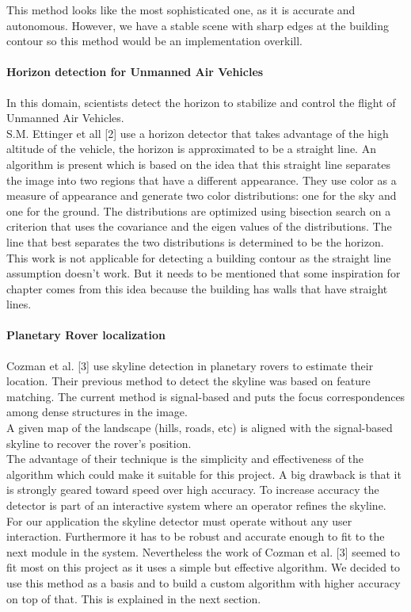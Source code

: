 This method looks like the most sophisticated one, as it is accurate and
autonomous. However, we have a stable scene with sharp edges at the
building contour so this method would be an implementation overkill.  


\paragraph{Horizon detection for Unmanned Air Vehicles}
In this domain, scientists detect the horizon to stabilize and control the
flight of Unmanned Air Vehicles.\\  
S.M. Ettinger et all [2] use a horizon detector that takes advantage of the high altitude of the vehicle, the
horizon is approximated to be a straight line.  An algorithm is present which is
based on the idea that this straight line separates the image into two regions
that have a different appearance. They use color as a measure of appearance and
generate two color distributions: one for the sky and one for the ground. The
distributions are optimized using bisection search on a criterion that uses the
covariance and the eigen values of the distributions. The line that best
separates the two distributions is determined to be the horizon.\\

This work is not applicable for detecting a building contour as the
straight line assumption doesn't work. But it needs to be mentioned that some
inspiration for chapter %
comes from this idea because the building has walls that have straight lines.

\paragraph{Planetary Rover localization}
Cozman et al. [3] use skyline detection in planetary rovers to estimate their location.  Their
previous method to detect the skyline was based on feature matching. The current
method is signal-based and puts the focus correspondences among dense structures
in the image.\\
A given map of the landscape (hills, roads, etc) is aligned with the
signal-based skyline to recover the rover's position.\\

The advantage of their technique is the simplicity and effectiveness of the
algorithm which could make it suitable for this project.  A big drawback is that
it is strongly geared toward speed over high accuracy. To increase accuracy the
detector is part of an interactive system where an operator refines the skyline.
For our application the skyline detector must operate without any user
interaction. Furthermore it has to be robust and accurate enough to fit to the next module
in the system.  Nevertheless the work of Cozman et al. [3] seemed to fit most on
this project as it uses a simple but effective algorithm.  We decided to use
this method as a basis and to build a custom algorithm with higher accuracy on
top of that. This is explained in the next section.



